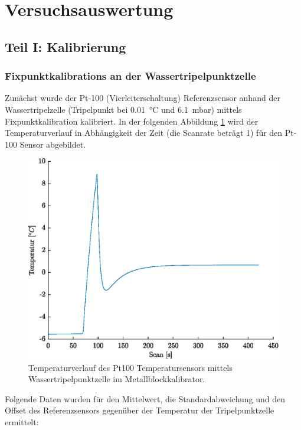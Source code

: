 \section{Versuchsauswertung}

\subsection{Teil I: Kalibrierung}

\subsubsection{Fixpunktkalibrations an der Wassertripelpunktzelle}

Zunächst wurde der Pt-100 (Vierleiterschaltung) Referenzsensor anhand der Wassertripelzelle (Tripelpunkt bei \SI{0,01}{\celsius} und \SI{6,1}{\milli\bar}) mittels Fixpunktkalibration kalibriert. In der folgenden Abbildung \ref{fig:Fixpunkt} wird der Temperaturverlauf in Abhängigkeit der Zeit (die Scanrate beträgt \SI{1}{\sec}) für den Pt-100 Sensor abgebildet. 

\begin{figure}[H]
	\centering
	\includegraphics[height=0.3\textheight]{../MLAB/Fixpunktkalibration.eps}
	\caption[Temperaturverlauf des Pt100 Temperatursensors mittels Wassertripelpunktzelle]{ Temperaturverlauf des Pt100 Temperatursensors mittels Wassertripelpunktzelle im Metallblockkalibrator.}
	\label{fig:Fixpunkt}
\end{figure}

Folgende Daten wurden für den Mittelwert, die Standardabweichung und den Offset des Referenzsensors gegenüber der Temperatur der Tripelpunktzelle ermittelt: 


